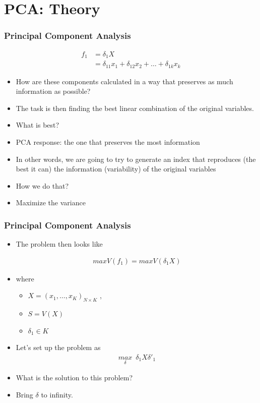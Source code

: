 \documentclass[
  shownotes,
  xcolor={svgnames},
  hyperref={colorlinks,citecolor=DarkBlue,linkcolor=DarkRed,urlcolor=DarkBlue}
  , aspectratio=169]{beamer}
\begin{document}
\section{PCA: Theory}
\begin{frame}
\frametitle{Principal Component Analysis}

\begin{align}
f_1 &= \delta_1 X \\
    &= \delta_{11} x_1+ \delta_{12} x_2 + \dots + \delta_{1k} x_k
\end{align}


\begin{itemize}
  \item How are these components calculated in a way that preserves as much information as possible?
  \medskip
  \item The task is then finding the best linear combination of the original variables.
  \medskip
  \item What is best?
  \medskip
  \pause
  \item PCA response: the one that preserves the most information
  \medskip
  \item In other words, we are going to try to generate an index that reproduces (the best it can) the information (variability) of the original variables
  \medskip
  \item How we do that?
  \pause
  \medskip
  \item Maximize the variance

\end{itemize}   
\end{frame}
\begin{frame}
\frametitle{Principal Component Analysis}

\begin{itemize}
  \item The problem then looks like

  \begin{align}
  max V(f_1) = max V(\delta_1 X)
  \end{align}

  \item where
  \begin{itemize}
    \item $X = (x_1 , \dots , x_K)_{N \times K}$  , 
    \item $S = V(X)$ 
    \item $\delta_1 \in K$
 \end{itemize}
  \item Let's set up the problem as 
  \begin{align}
  \underset{\delta}{max}\,\,\, \delta_1 X \delta'_1
  \end{align}

  \item What is the solution to this problem?

 \pause
  \item Bring $\delta$ to infinity. 
 
\end{itemize}
 \end{frame}
\end{document}
